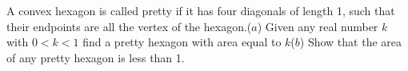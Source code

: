 A convex hexagon is called pretty if it has four diagonals of length 1, such that their endpoints are all the vertex of the hexagon.($a$) Given any real number $k$ with $0<k<1$ find a pretty hexagon with area equal to $k$($b$) Show that the area of any pretty hexagon is less than 1.